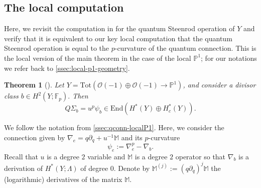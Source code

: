 \documentclass[reqno]{amsart}
\numberwithin{equation}{section}
\numberwithin{equation}{section}
\numberwithin{equation}{section}
\newtheorem{thm}{Theorem}[section]
\theoremstyle{definition}
\theoremstyle{remark}
\theoremstyle{remark}
\begin{document}
\subsection{The local computation}\label{ssec:local-p1-computation}
Here, we revisit the computation in \cite[Section 4]{Lee23a} for the quantum Steenrod operation of $Y$ and verify that it is equivalent to our key local computation that the quantum Steenrod operation is equal to the $p$-curvature of the quantum connection. This is the local version of the main theorem in the case of the local $\mathbb{P}^1$; for our notations we refer back to \cref{ssec:local-p1-geometry}.

\begin{thm}[{\cite[Corollary 4.16]{Lee23a}}]\label{thm:localP1-qst-is-pcurv}
    Let $Y = \mathrm{Tot}(\mathcal{O}(-1) \oplus \mathcal{O}(-1) \to \mathbb{P}^1)$, and consider a divisor class $b \in H^2(Y;\mathbb{F}_p).$  Then
    \begin{equation}
        Q\Sigma_b = u^p \psi_b  \in \mathrm{End}(H^*(Y) \oplus H^*_c(Y)).
    \end{equation}
\end{thm}

We follow the notation from \cref{ssec:qconn-localP1}. Here, we consider the connection given by $\nabla_e =  q \partial_q + u^{-1} \mathbb{M}$ and its $p$-curvature
\begin{equation}
    \psi_e := \nabla_e^p - \nabla_b.
\end{equation}
Recall that $u$ is a degree $2$ variable and $\mathbb{M}$ is a degree $2$ operator so that $\nabla_b$ is a derivation of $H^*(Y;\Lambda)$ of degree $0$. Denote by $\mathbb{M}^{(j)} := (q\partial_q)^j \mathbb{M}$ the (logarithmic) derivatives of the matrix $\mathbb{M}$.
\end{document}
